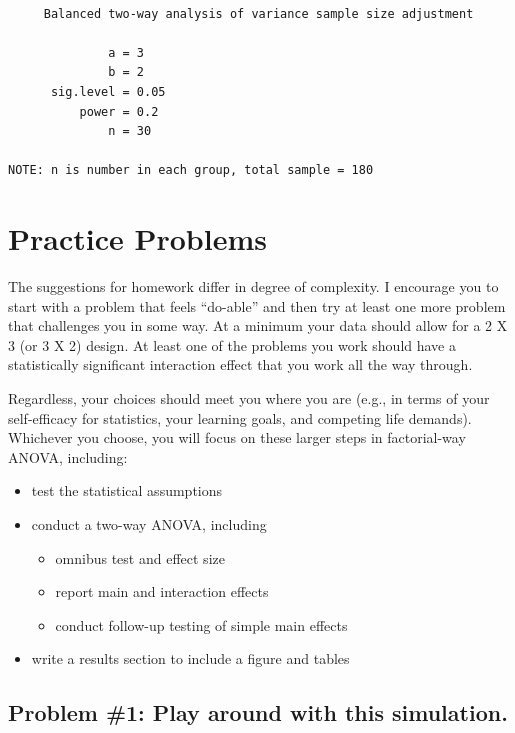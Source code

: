 \documentclass[
  11pt,
]{book}
\providecommand{\tightlist}{%
  \setlength{\itemsep}{0pt}\setlength{\parskip}{0pt}}
\begin{document}
\begin{verbatim}

     Balanced two-way analysis of variance sample size adjustment 

              a = 3
              b = 2
      sig.level = 0.05
          power = 0.2
              n = 30

NOTE: n is number in each group, total sample = 180
\end{verbatim}

\hypertarget{practice-problems-6}{%
\section{Practice Problems}\label{practice-problems-6}}

The suggestions for homework differ in degree of complexity. I encourage you to start with a problem that feels ``do-able'' and then try at least one more problem that challenges you in some way. At a minimum your data should allow for a 2 X 3 (or 3 X 2) design. At least one of the problems you work should have a statistically significant interaction effect that you work all the way through.

Regardless, your choices should meet you where you are (e.g., in terms of your self-efficacy for statistics, your learning goals, and competing life demands). Whichever you choose, you will focus on these larger steps in factorial-way ANOVA, including:

\begin{itemize}
\tightlist
\item
  test the statistical assumptions
\item
  conduct a two-way ANOVA, including

  \begin{itemize}
  \tightlist
  \item
    omnibus test and effect size
  \item
    report main and interaction effects
  \item
    conduct follow-up testing of simple main effects
  \end{itemize}
\item
  write a results section to include a figure and tables
\end{itemize}

\hypertarget{problem-1-play-around-with-this-simulation.-1}{%
\subsection{Problem \#1: Play around with this simulation.}\label{problem-1-play-around-with-this-simulation.-1}}
\end{document}
